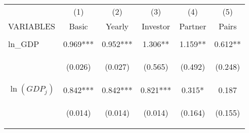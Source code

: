 \begin{center}
\begin{tabular}{lccccc} \hline
 & (1) & (2) & (3) & (4) & (5) \\
VARIABLES & Basic & Yearly & Investor & Partner & Pairs \\ \hline
\vspace{4pt} & \begin{footnotesize}\end{footnotesize} & \begin{footnotesize}\end{footnotesize} & \begin{footnotesize}\end{footnotesize} & \begin{footnotesize}\end{footnotesize} & \begin{footnotesize}\end{footnotesize} \\
ln\_GDP & 0.969*** & 0.952*** & 1.306** & 1.159** & 0.612** \\
\vspace{4pt} & \begin{footnotesize}(0.026)\end{footnotesize} & \begin{footnotesize}(0.027)\end{footnotesize} & \begin{footnotesize}(0.565)\end{footnotesize} & \begin{footnotesize}(0.492)\end{footnotesize} & \begin{footnotesize}(0.248)\end{footnotesize} \\
$\ln(GDP_j)$ & 0.842*** & 0.842*** & 0.821*** & 0.315* & 0.187 \\
\vspace{4pt} & \begin{footnotesize}(0.014)\end{footnotesize} & \begin{footnotesize}(0.014)\end{footnotesize} & \begin{footnotesize}(0.014)\end{footnotesize} & \begin{footnotesize}(0.164)\end{footnotesize} & \begin{footnotesize}(0.155)\end{footnotesize} \\

\end{tabular}
\end{center}
